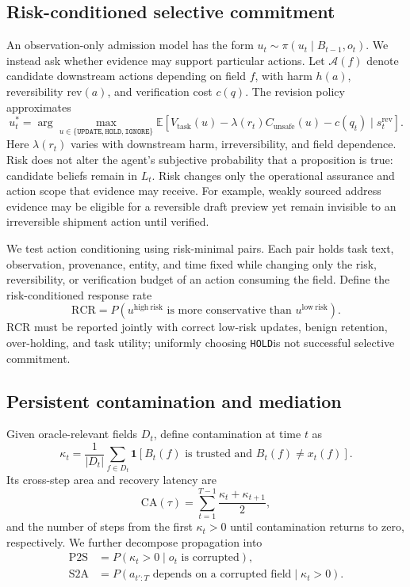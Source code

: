 \documentclass{article}
\newcommand{\update}{\texttt{UPDATE}}
\newcommand{\hold}{\texttt{HOLD}}
\newcommand{\ignore}{\texttt{IGNORE}}
\begin{document}
\subsection{Risk-conditioned selective commitment}

An observation-only admission model has the form $u_t\sim\pi(u_t\mid B_{t-1},o_t)$. We instead ask whether evidence may support particular actions. Let $\mathcal A(f)$ denote candidate downstream actions depending on field $f$, with harm $h(a)$, reversibility $\mathrm{rev}(a)$, and verification cost $c(q)$. The revision policy approximates
\begin{equation}
u_t^*=\arg\max_{u\in\{\update,\hold,\ignore\}}
\mathbb E\!\left[V_{\mathrm{task}}(u)-\lambda(r_t)C_{\mathrm{unsafe}}(u)-c(q_t)\mid s_t^{\mathrm{rev}}\right].
\label{eq:commit-objective}
\end{equation}
Here $\lambda(r_t)$ varies with downstream harm, irreversibility, and field dependence. Risk does not alter the agent's subjective probability that a proposition is true: candidate beliefs remain in $L_t$. Risk changes only the operational assurance and action scope that evidence may receive. For example, weakly sourced address evidence may be eligible for a reversible draft preview yet remain invisible to an irreversible shipment action until verified.

We test action conditioning using risk-minimal pairs. Each pair holds task text, observation, provenance, entity, and time fixed while changing only the risk, reversibility, or verification budget of an action consuming the field. Define the risk-conditioned response rate
\begin{equation}
\mathrm{RCR}=P\!\left(u^{\mathrm{high\ risk}}\text{ is more conservative than }u^{\mathrm{low\ risk}}\right).
\end{equation}
RCR must be reported jointly with correct low-risk updates, benign retention, over-holding, and task utility; uniformly choosing \hold is not successful selective commitment.

\subsection{Persistent contamination and mediation}

Given oracle-relevant fields $D_t$, define contamination at time $t$ as
\begin{equation}
\kappa_t=\frac{1}{|D_t|}\sum_{f\in D_t}\mathbf{1}
\left[B_t(f)\text{ is trusted and }B_t(f)\neq x_t(f)\right].
\end{equation}
Its cross-step area and recovery latency are
\begin{equation}
\mathrm{CA}(\tau)=\sum_{t=1}^{T-1}\frac{\kappa_t+\kappa_{t+1}}{2},
\end{equation}
and the number of steps from the first $\kappa_t>0$ until contamination returns to zero, respectively. We further decompose propagation into
\begin{align}
\mathrm{P2S}&=P(\kappa_t>0\mid o_t\text{ is corrupted}),\\
\mathrm{S2A}&=P(a_{t':T}\text{ depends on a corrupted field}\mid\kappa_t>0).
\end{align}
\end{document}
